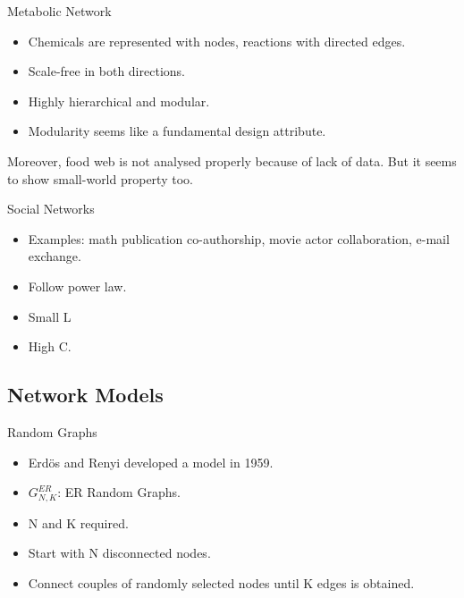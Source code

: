 \documentclass{beamer}
\begin{document}
\begin{frame}{Metabolic Network}

\begin{itemize}
 \item Chemicals are represented with nodes, reactions with directed edges.
 \item Scale-free in both directions.
 \item Highly hierarchical and modular.
 \item Modularity seems like a fundamental design attribute.
\end{itemize}

Moreover, food web is not analysed properly because of lack of data. But it seems to show small-world property too.

\end{frame}



\begin{frame}{Social Networks}

\begin{itemize}
 \item Examples: math publication co-authorship, movie actor collaboration, e-mail exchange.
 \item Follow power law.
 \item Small L
 \item High C.
\end{itemize}

\end{frame}


\subsection{Network Models}
\begin{frame}{Random Graphs}

\begin{itemize}
 \item Erdös and Renyi developed a model in 1959.
 \item $G_{N,K}^{ER}$: ER Random Graphs.
 \item N and K required.
 \item Start with N disconnected nodes.
 \item Connect couples of randomly selected nodes until K edges is obtained.
\end{itemize}

\end{frame}
\end{document}
